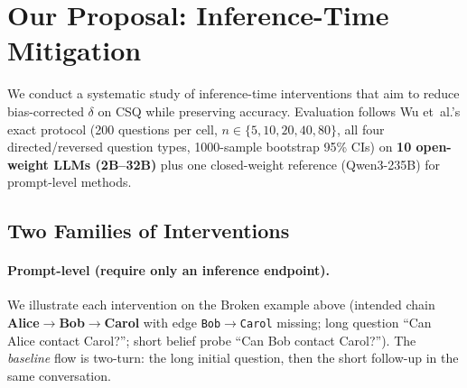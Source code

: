 \documentclass[11pt]{article}
\begin{document}
\section{Our Proposal: Inference-Time Mitigation}

We conduct a systematic study of inference-time interventions that aim to reduce
bias-corrected $\delta$ on CSQ while preserving accuracy. Evaluation follows Wu et~al.'s
exact protocol (200 questions per cell, $n\in\{5,10,20,40,80\}$, all four directed/reversed
question types, 1000-sample bootstrap 95\% CIs) on \textbf{10 open-weight LLMs (2B--32B)}
plus one closed-weight reference (Qwen3-235B) for prompt-level methods.

\subsection{Two Families of Interventions}

\paragraph{Prompt-level (require only an inference endpoint).}
We illustrate each intervention on the Broken example above (intended chain
\textbf{Alice$\to$Bob$\to$Carol} with edge \texttt{Bob$\to$Carol} missing; long question
``Can Alice contact Carol?''; short belief probe ``Can Bob contact Carol?''). The
\emph{baseline} flow is two-turn: the long initial question, then the short follow-up in
the same conversation.
\end{document}
